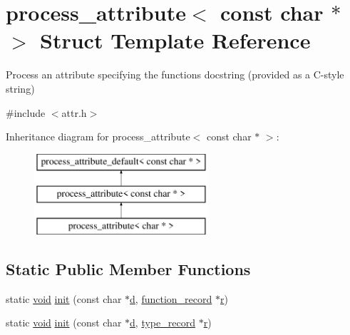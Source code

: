 \hypertarget{structprocess__attribute_3_01const_01char_01_5_01_4}{}\section{process\+\_\+attribute$<$ const char $\ast$ $>$ Struct Template Reference}
\label{structprocess__attribute_3_01const_01char_01_5_01_4}


Process an attribute specifying the function\textquotesingle{}s docstring (provided as a C-\/style string)  




{\ttfamily \#include $<$attr.\+h$>$}

Inheritance diagram for process\+\_\+attribute$<$ const char $\ast$ $>$\+:\begin{figure}[H]
\begin{center}
\leavevmode
\includegraphics[height=3.000000cm]{structprocess__attribute_3_01const_01char_01_5_01_4}
\end{center}
\end{figure}
\subsection*{Static Public Member Functions}
\begin{DoxyCompactItemize}
\item 
static \mbox{\hyperlink{_s_d_l__opengles2__gl2ext_8h_ae5d8fa23ad07c48bb609509eae494c95}{void}} \mbox{\hyperlink{structprocess__attribute_3_01const_01char_01_5_01_4_aa3fbc8ac0ed21420fb92774ff884cd8c}{init}} (const char $\ast$\mbox{\hyperlink{pystrtod_8h_aebc55cdba1447f899efca30032620f9e}{d}}, \mbox{\hyperlink{structfunction__record}{function\+\_\+record}} $\ast$\mbox{\hyperlink{_s_d_l__opengl_8h_a42ce7cdc612e53abee15043f80220d97}{r}})
\item 
static \mbox{\hyperlink{_s_d_l__opengles2__gl2ext_8h_ae5d8fa23ad07c48bb609509eae494c95}{void}} \mbox{\hyperlink{structprocess__attribute_3_01const_01char_01_5_01_4_a6c0c61df22dfb8a89cf803ea8b51cbb4}{init}} (const char $\ast$\mbox{\hyperlink{pystrtod_8h_aebc55cdba1447f899efca30032620f9e}{d}}, \mbox{\hyperlink{structtype__record}{type\+\_\+record}} $\ast$\mbox{\hyperlink{_s_d_l__opengl_8h_a42ce7cdc612e53abee15043f80220d97}{r}})
\end{DoxyCompactItemize}



